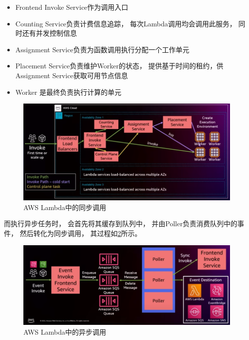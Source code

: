 \begin{itemize}
    \item Frontend Invoke Service作为调用入口
    \item Counting Service负责计费信息追踪，
    每次Lambda调用均会调用此服务，
    同时还有并发控制信息
    \item Assignment Service负责为函数调用执行分配一个工作单元
    \item Placement Service负责维护Worker的状态，
    提供基于时间的租约，供Assignment Service获取可用节点信息
    \item Worker 是最终负责执行计算的单元
\end{itemize}


\begin{figure}[ht!]
    \centering
    \includegraphics[width=\linewidth]{images/lambda_sync.png}
    \caption{AWS Lambda中的同步调用\cite{aws_lambda_2022}}
    \label{lambda_sync}
\end{figure}

而执行异步任务时，
会首先将其缓存到队列中，
并由Poller负责消费队列中的事件，
然后转化为同步调用，
其过程如\cref{lambda_async}所示。

\begin{figure}[ht!]
    \centering
    \includegraphics[width=\linewidth]{images/lambda_async.png}
    \caption{AWS Lambda中的异步调用\cite{aws_lambda_2022}}
    \label{lambda_async}
\end{figure}

